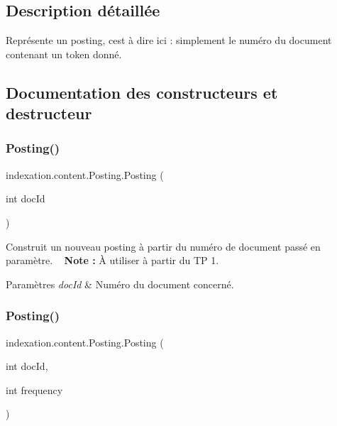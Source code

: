 \subsection{Description détaillée}
Représente un posting, c\textquotesingle{}est à dire ici \+: simplement le numéro du document contenant un token donné. 

\subsection{Documentation des constructeurs et destructeur}
\mbox{\label{classindexation_1_1content_1_1Posting_a3f69124d394ca8dba1dd17e9ffd025cd}} 
\subsubsection{\texorpdfstring{Posting()}{Posting()}\hspace{0.1cm}{\footnotesize\ttfamily [1/2]}}
{\footnotesize\ttfamily indexation.\+content.\+Posting.\+Posting (\begin{DoxyParamCaption}\item[{int}]{doc\+Id }\end{DoxyParamCaption})}

Construit un nouveau posting à partir du numéro de document passé en paramètre. ~\newline
 {\bfseries Note \+:} À utiliser à partir du TP 1.


\begin{DoxyParams}{Paramètres}
{\em doc\+Id} & Numéro du document concerné. \\
\hline
\end{DoxyParams}
\mbox{\label{classindexation_1_1content_1_1Posting_a5e496e0ae1259f6c32b1c1e41d5f97e0}} 
\subsubsection{\texorpdfstring{Posting()}{Posting()}\hspace{0.1cm}{\footnotesize\ttfamily [2/2]}}
{\footnotesize\ttfamily indexation.\+content.\+Posting.\+Posting (\begin{DoxyParamCaption}\item[{int}]{doc\+Id,  }\item[{int}]{frequency }\end{DoxyParamCaption})}


